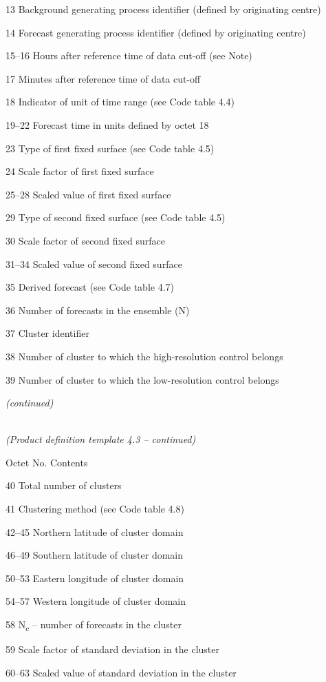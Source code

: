 13 Background generating process identifier (defined by originating centre)

14 Forecast generating process identifier (defined by originating centre)

15--16 Hours after reference time of data cut-off (see Note)

17 Minutes after reference time of data cut-off

18 Indicator of unit of time range (see Code table 4.4)

19--22 Forecast time in units defined by octet 18

23 Type of first fixed surface (see Code table 4.5)

24 Scale factor of first fixed surface

25--28 Scaled value of first fixed surface

29 Type of second fixed surface (see Code table 4.5)

30 Scale factor of second fixed surface

31--34 Scaled value of second fixed surface

35 Derived forecast (see Code table 4.7)

36 Number of forecasts in the ensemble (N)

37 Cluster identifier

38 Number of cluster to which the high-resolution control belongs

39 Number of cluster to which the low-resolution control belongs

\emph{(continued)}

\emph{\\
(Product definition template 4.3 -- continued)}

Octet No. Contents

40 Total number of clusters

41 Clustering method (see Code table 4.8)

42--45 Northern latitude of cluster domain

46--49 Southern latitude of cluster domain

50--53 Eastern longitude of cluster domain

54--57 Western longitude of cluster domain

58 N\textsubscript{c} -- number of forecasts in the cluster

59 Scale factor of standard deviation in the cluster

60--63 Scaled value of standard deviation in the cluster

